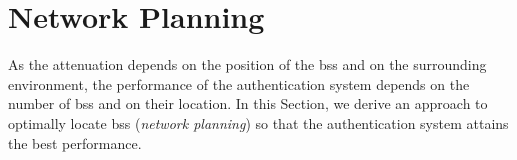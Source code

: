 \documentclass[conference,draftcls,onecolumn]{IEEEtran}
\begin{document}



\section{Network Planning}\label{sec:bsPos}

As the attenuation depends on the position of the \acp{bs} and on the surrounding environment, the performance of the authentication system depends on the number of \acp{bs} and on their location. In this Section, we derive an approach to optimally locate \acp{bs} (\emph{network planning}) so that the authentication system attains the best performance. 
\end{document}
